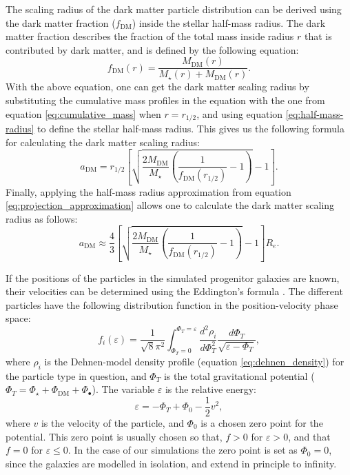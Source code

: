 \documentclass[english, twoside]{HYgradu}
\begin{document}
The scaling radius of the dark matter particle distribution can be derived using the dark matter fraction ($f_{\mathrm{DM}}$) inside the stellar half-mass radius. The dark matter fraction describes the fraction of the total mass inside radius $r$ that is contributed by dark matter, and is defined by the following equation:
\begin{equation}
f_\mathrm{DM}(r) = \frac{M_\mathrm{DM}(r)}{M_\star(r) + M_\mathrm{DM}(r)}. \label{eq:dm_fraction}
\end{equation}
With the above equation, one can get the dark matter scaling radius by substituting the cumulative mass profiles in the equation with the one from equation \ref{eq:cumulative_mass} when $r=r_{1/2}$, and using equation \ref{eq:half-mass-radius} to define the stellar half-mass radius. This gives us the following formula for calculating the dark matter scaling radius:
\begin{equation}
a_\mathrm{DM} =  r_\mathrm{1/2} \left[ \sqrt{\frac{2M_\mathrm{DM}}{M_\star} \left( \frac{1}{f_\mathrm{DM}(r_{1/2})} - 1 \right)} -1 \right].
\end{equation}
Finally, applying the half-mass radius approximation from equation \ref{eq:projection_approximation} allows one to calculate the dark matter scaling radius as follows:
\begin{equation}
a_\mathrm{DM} \approx \frac{4}{3} \left[ \sqrt{\frac{2M_\mathrm{DM}}{M_\star} \left( \frac{1}{f_\mathrm{DM}(r_{1/2})} - 1 \right)} -1 \right] R_e.
\end{equation}

If the positions of the particles in the simulated progenitor galaxies are known, their velocities can be determined using the Eddington's formula \citep{BinneyTremaine}. The different particles have the following distribution function in the position-velocity phase space:
\begin{equation}
f_i(\varepsilon) = \frac{1}{\sqrt{8}\pi^2} \int^{\Phi_T = \varepsilon}_{\Phi_T = 0} \frac{d^2\rho_i}{d\Phi^2_T}
\frac{d\Phi_T}{\sqrt{\varepsilon - \Phi_T}}, \label{eq:eddington_form}
\end{equation}
where $\rho_i$ is the Dehnen-model density profile (equation \ref{eq:dehnen_density}) for the particle type in question, and $\Phi_T$ is the total gravitational potential ($\Phi_T = \Phi_\star + \Phi_\mathrm{DM} + \Phi_\bullet$). The variable $\varepsilon$ is the relative energy:
\begin{equation}
\varepsilon = -\Phi_T + \Phi_0 - \frac{1}{2} v^2,
\end{equation}
where $v$ is the velocity of the particle, and $\Phi_0$ is a chosen zero point for the potential. This zero point is usually chosen so that, $f > 0$ for $\varepsilon > 0$, and that $f = 0$ for $\varepsilon \leq 0$. In the case of our simulations the zero point is set as $\Phi_0 = 0$, since the galaxies are modelled in isolation, and extend in principle to infinity.
\end{document}
